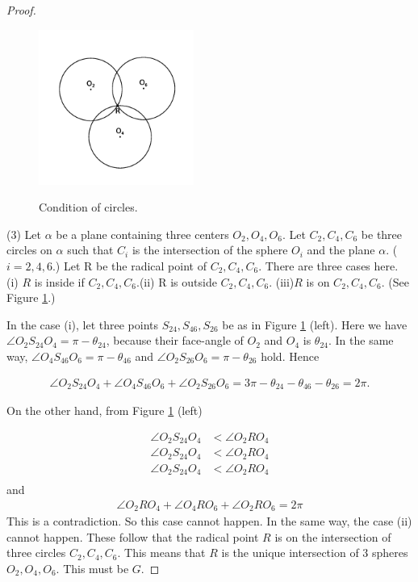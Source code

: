 \documentclass[suppldata, dvipdfmx]{interact}
\theoremstyle{plain}%
\theoremstyle{definition}
\theoremstyle{remark}
\theoremstyle{problemstyle}
\begin{document}
\begin{proof}
\begin{figure}[h!tbp]
\begin{minipage}[t]{0.3\textwidth}
   \includegraphics[width=2in, keepaspectratio]{./img/HexahedraWithSphericalFaces/threeCircles3.jpg}
   \subcaption{}
   \label{fig:condition3}
  \end{minipage}
  \caption{Condition of circles.}
  \label{fig:threeCircles}
\end{figure}


(3) Let $\alpha$ be a plane containing three centers $O_2, O_4, O_6$. Let
 $C_2, C_4, C_6$ be three circles on $\alpha$ such that $C_i$ is the
 intersection of the sphere $O_i$ and the plane $\alpha$. ($i=2, 4, 6$.)
Let R be the radical point of $C_2, C_4, C_6$. There are three cases
 here.
(i) $R$ is inside if $C_2, C_4, C_6$.(ii) R is outside $C_2, C_4, C_6$.
(iii)$R$ is on $C_2, C_4, C_6$. (See Figure \ref{fig:threeCircles}.)

In the case (i), let three points $S_{24}, S_{46}, S_{26}$ be as in Figure
\ref{fig:threeCircles} (left). Here we have
$\angle O_2 S_{24} O_4 = \pi - \theta_{24}$,
because their face-angle of $O_2$ and $O_4$ is $\theta_{24}$.
In the same way, $\angle O_4 S_{46}O_6 = \pi - \theta_{46}$ and
$\angle O_2S_{26}O_6 = \pi-\theta_{26}$ hold. Hence

\begin{align*}
 \angle O_2 S_{24} O_4 + \angle O_4 S_{46} O_6 + \angle O_2 S_{26} O_6 = 3\pi -
 \theta_{24} - \theta_{46} - \theta_{26} = 2\pi.
\end{align*}

On the other hand, from Figure \ref{fig:threeCircles} (left)

\begin{align*}
 \angle O_2 S_{24} O_4 &< \angle O_2 R O_4\\
 \angle O_2 S_{24} O_4 &< \angle O_2 R O_4\\
 \angle O_2 S_{24} O_4 &< \angle O_2 R O_4\\
\end{align*}
and
\begin{align*}
 \angle O_2 R O_4 + \angle O_4 R O_6 + \angle O_2 R O_6 = 2\pi
\end{align*}
This is a contradiction. So this case cannot happen. In the same way,
 the case (ii) cannot happen. These follow that the radical point $R$
 is on the intersection of three circles $C_2, C_4, C_6.$ This means that
 $R$ is the unique intersection of 3 spheres $O_2, O_4, O_6$. This must
 be $G$.


\end{proof}
\end{document}
